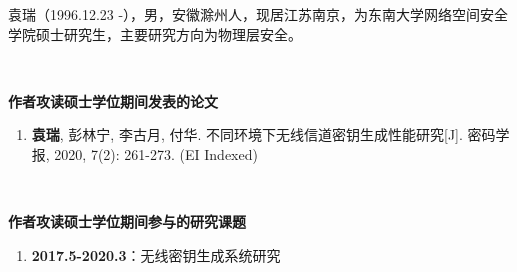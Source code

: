 
袁瑞（1996.12.23 -），男，安徽滁州人，现居江苏南京，为东南大学网络空间安全学院硕士研究生，主要研究方向为物理层安全。

~~

\begin{flushleft} 
  \bfseries\large 作者攻读硕士学位期间发表的论文\\
  \relax
\end{flushleft}

\begin{enumerate}
  \renewcommand{\labelenumi}{[\theenumi].}
  \item \textbf{袁瑞}, 彭林宁, 李古月, 付华. 不同环境下无线信道密钥生成性能研究[J]. 密码学报, 2020, 7(2): 261-273. (EI Indexed)
\end{enumerate}

~~

\begin{flushleft}
  \bfseries\large 作者攻读硕士学位期间参与的研究课题\\
  \relax
\end{flushleft}

\begin{enumerate}
  \renewcommand{\labelenumi}{[\theenumi].}
  \item \textbf{2017.5-2020.3}：无线密钥生成系统研究
\end{enumerate}
